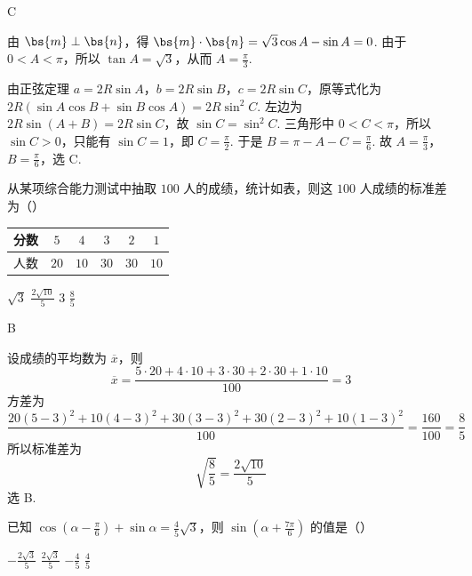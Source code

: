 \begin{answer}
C
\end{answer}

\begin{solution}
由 \(\bs{m}\perp\bs{n}\)，得 \(\bs{m}\cdot\bs{n}=\sqrt3\cos A-\sin A=0\). 由于 \(0<A<\pi\)，所以 \(\tan A=\sqrt3\)，从而 \(A=\frac\pi3\).

由正弦定理 \(a=2R\sin A\)，\(b=2R\sin B\)，\(c=2R\sin C\)，原等式化为 \(2R(\sin A\cos B+\sin B\cos A)=2R\sin^2C\). 左边为 \(2R\sin(A+B)=2R\sin C\)，故 \(\sin C=\sin^2C\). 三角形中 \(0<C<\pi\)，所以 \(\sin C>0\)，只能有 \(\sin C=1\)，即 \(C=\frac\pi2\). 于是 \(B=\pi-A-C=\frac\pi6\).
故 \(A=\frac\pi3\)，\(B=\frac\pi6\)，选 C.
\end{solution}

\begin{problem}
从某项综合能力测试中抽取 \(100\) 人的成绩，统计如表，则这 \(100\) 人成绩的标准差为（\quad）

\begin{center}
\begin{tabular}{c|ccccc}
分数 & \(5\) & \(4\) & \(3\) & \(2\) & \(1\) \\
\hline
人数 & \(20\) & \(10\) & \(30\) & \(30\) & \(10\)
\end{tabular}
\end{center}

\choices
    {\(\sqrt{3}\)}
    {\(\frac{2\sqrt{10}}{5}\)}
    {\(3\)}
    {\(\frac{8}{5}\)}
\end{problem}

\begin{answer}
B
\end{answer}

\begin{solution}
设成绩的平均数为 \(\overline{x}\)，则
\[
\overline{x}=\frac{5\cdot20+4\cdot10+3\cdot30+2\cdot30+1\cdot10}{100}=3
\]
方差为
\[
\frac{20(5-3)^2+10(4-3)^2+30(3-3)^2+30(2-3)^2+10(1-3)^2}{100}
 =\frac{160}{100}=\frac85
\]
所以标准差为
\[
\sqrt{\frac85}=\frac{2\sqrt{10}}5
\]选 B.
\end{solution}

\begin{problem}
已知 \(\cos \left( \alpha - \frac{\pi}{6} \right) + \sin \alpha = \frac{4}{5} \sqrt{3}\)，则 \(\sin \left( \alpha + \frac{7\pi}{6} \right)\) 的值是（\quad）

\choices
    {\(-\frac{2\sqrt{3}}{5}\)}
    {\(\frac{2\sqrt{3}}{5}\)}
    {\(-\frac{4}{5}\)}
    {\(\frac{4}{5}\)}
\end{problem}

